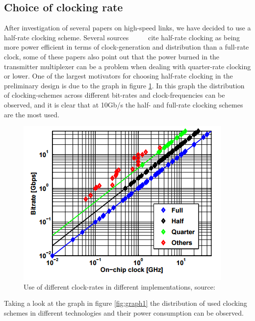 \subsection{Choice of clocking rate}
After investigation of several papers on high-speed links, we have decided to use a half-rate clocking scheme. Several sources ~\cite{rajesh2011a} ~\cite{palermo2010a} ~\cite{cressler2007a} cite half-rate clocking as being more power efficient in terms of clock-generation and distribution than a full-rate clock, some of these papers also point out that the power burned in the transmitter multiplexer can be a problem when dealing with quarter-rate clocking or lower. One of the largest motivators for choosing half-rate clocking in the preliminary design is due to the graph in figure \ref{fig:graph}. In this graph the distribution of clocking-schemes across different bit-rates and clock-frequencies can be observed, and it is clear that at 10Gb/s the half- and full-rate clocking schemes are the most used.

\begin{figure}[H]
\begin{center}
\includegraphics[scale=1.2]{img/clock0}
\caption{Use of different clock-rates in different implementations, source: ~\cite{rajesh2011a}}
\label{fig:graph}
\end{center}
\end{figure}

Taking a look at the graph in figure \ref{fig:graph1} the distribution of used clocking schemes in different technologies and their power consumption can be observed.

